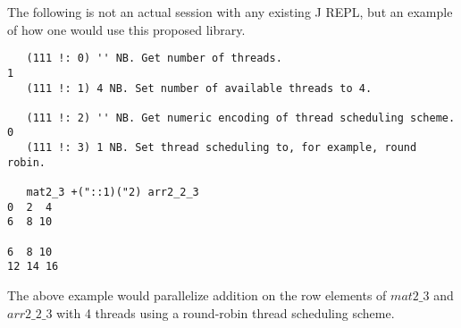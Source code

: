 The following is not an actual session with any existing J REPL, 
but an example of how one would use this proposed library.

\begin{verbatim}
   (111 !: 0) '' NB. Get number of threads.
1
   (111 !: 1) 4 NB. Set number of available threads to 4.

   (111 !: 2) '' NB. Get numeric encoding of thread scheduling scheme.
0
   (111 !: 3) 1 NB. Set thread scheduling to, for example, round robin.

   mat2_3 +("::1)("2) arr2_2_3
0  2  4
6  8 10

6  8 10
12 14 16
\end{verbatim}

The above example would parallelize addition on the row elements of $mat2\_3$ and $arr2\_2\_3$ 
with 4 threads using a round-robin thread scheduling scheme.
